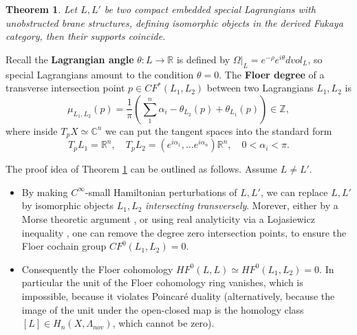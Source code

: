 \documentclass[a4paper]{article}
\newtheorem{thm}{Theorem}[section]
\theoremstyle{definition}
\newcommand{\R}{\mathbb{R}}
\newcommand{\C}{\mathbb{C}}
\newcommand{\Z}{\mathbb{Z}}
\begin{document}
\begin{thm}\cite{ThomasYau}\cite{JoyceImagi}\cite{Imagi}\label{ThomasYauuniqueness}
Let $L,L'$ be two compact embedded special Lagrangians with unobstructed brane structures, defining isomorphic objects in the derived Fukaya category, then their supports coincide.
\end{thm}



Recall the \textbf{Lagrangian angle} $\theta: L\to \R$ is defined by $\Omega|_L= e^{-\rho} e^{i\theta}dvol_L$, so special Lagrangians amount to the condition $\theta=0$.  The \textbf{Floer degree} of a transverse intersection point $p\in CF^*(L_1,L_2)$ between two Lagrangians $L_1, L_2$ is
\begin{equation}\label{degree}
\mu_{L_1,L_2} (p)=\frac{1}{\pi} (\sum_1^n \alpha_i - \theta_{L_2} (p) + \theta_{L_1} (p)  )\in \Z,
\end{equation}
where inside $T_pX\simeq \C^n$ we can put the tangent spaces into the standard form
\[
T_p L_1= \R^n, \quad T_pL_2= (e^{i\alpha_1},\ldots e^{i\alpha_n})\R^n,\quad 0<\alpha_i<\pi.
\]







The proof idea of Theorem \ref{ThomasYauuniqueness} can be outlined as follows. Assume $L\neq L'$.

\begin{itemize}
\item By making $C^\infty$-small Hamiltonian perturbations of $L,L'$, we can replace $L,L'$ by isomorphic objects $L_1,L_2$ \emph{intersecting transversely}. Morever, either by a Morse theoretic argument \cite{ThomasYau}, or using real analyticity via a Lojasiewicz inequality \cite{JoyceImagi}, 
one can remove the degree zero intersection points, to ensure the Floer cochain group $CF^0(L_1,L_2)=0$.

\item Consequently the Floer cohomology $HF^0(L,L)\simeq HF^0(L_1,L_2)=0$. In particular the unit of the Floer cohomology ring vanishes, which is impossible, because it violates Poincar\'e duality (alternatively, because the image of the unit under the open-closed map is the homology class $[L]\in H_n(X, \Lambda_{nov})$, which cannot be zero).
\end{itemize}
\end{document}
